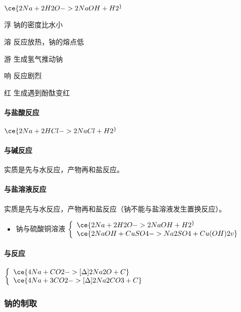 $\ce{2Na + 2H2O -> 2NaOH + H2 ^}$

\begin{description}
	\item{浮} 钠的密度比水小
	\item{溶} 反应放热，钠的熔点低
	\item{游} 生成氢气推动钠
	\item{响} 反应剧烈
	\item{红} 生成遇到酚酞变红
\end{description}

\paragraph{与盐酸反应}

$\ce{2Na + 2HCl -> 2NaCl + H2 ^}$

\paragraph{与碱反应}

实质是先与水反应，产物再和盐反应。

\paragraph{与盐溶液反应}

实质是先与水反应，产物再和盐反应（钠不能与盐溶液发生置换反应）。

\begin{itemize}
	\item 钠与硫酸铜溶液
	$\left\{\begin{array}{lr}
		\ce{2Na + 2H2O -> 2NaOH + H2 ^}\\
		\ce{2NaOH + CuSO4 -> Na2SO4 + Cu(OH)2 v}\\
	\end{array}\right.$
\end{itemize}

\paragraph{与反应}

$\left\{\begin{array}{lr}
	\ce{4Na + CO2 ->[\Delta] 2Na2O + C}\\
	\ce{4Na + 3CO2 ->[\Delta] 2Na2CO3 + C}\\
		\end{array}\right.$

\subsubsection{钠的制取}

